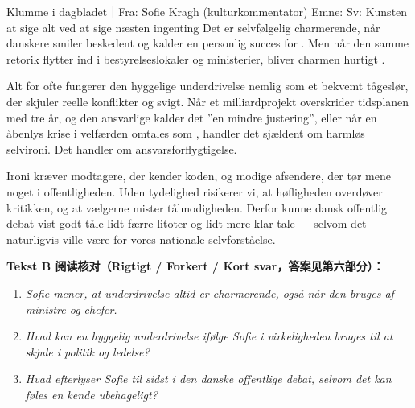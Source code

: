 \begin{emailbox}{Klumme i dagbladet｜Fra: Sofie Kragh (kulturkommentator) \quad Emne: Sv: Kunsten at sige alt ved at sige næsten ingenting}
Det er selvfølgelig charmerende, når danskere smiler beskedent og kalder en personlig succes for . Men når den samme retorik flytter ind i bestyrelseslokaler og ministerier, bliver charmen hurtigt .

Alt for ofte fungerer den hyggelige underdrivelse nemlig som et bekvemt tågeslør, der skjuler reelle konflikter og svigt. Når et milliardprojekt overskrider tidsplanen med tre år, og den ansvarlige kalder det ”en mindre justering”, eller når en åbenlys krise i velfærden omtales som , handler det sjældent om harmløs selvironi. Det handler om ansvarsforflygtigelse.

Ironi kræver modtagere, der kender koden, og modige afsendere, der tør mene noget i offentligheden. Uden tydelighed risikerer vi, at høfligheden overdøver kritikken, og at vælgerne mister tålmodigheden. Derfor kunne dansk offentlig debat vist godt tåle lidt færre litoter og lidt mere klar tale --- selvom det naturligvis ville være  for vores nationale selvforståelse.
\end{emailbox}

\textbf{Tekst B 阅读核对（Rigtigt / Forkert / Kort svar，答案见第六部分）：}
\begin{enumerate}
  \item \textit{Sofie mener, at underdrivelse altid er charmerende, også når den bruges af ministre og chefer.} \\\underline{\hspace{2.2cm}}
  \item \textit{Hvad kan en hyggelig underdrivelse ifølge Sofie i virkeligheden bruges til at skjule i politik og ledelse?} \underline{\hspace{2.2cm}}
  \item \textit{Hvad efterlyser Sofie til sidst i den danske offentlige debat, selvom det kan føles en kende ubehageligt?} \underline{\hspace{2.2cm}}
\end{enumerate}

